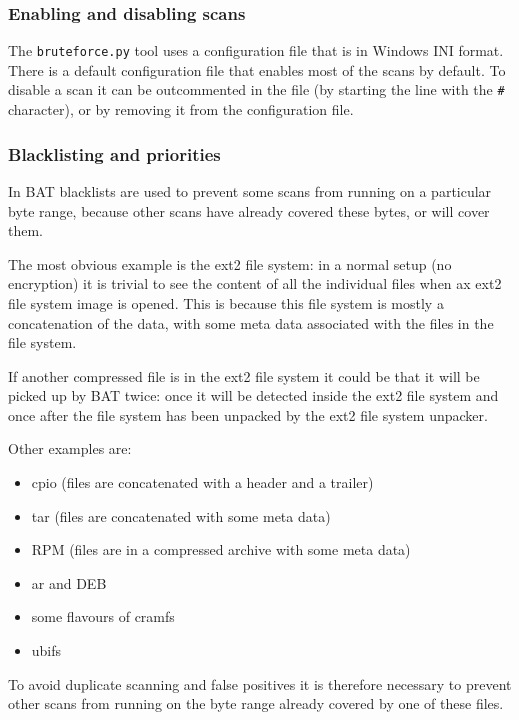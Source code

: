 \documentclass[10pt]{article}
\begin{document}
\subsubsection{Enabling and disabling scans}

The \texttt{bruteforce.py} tool uses a configuration file that is in Windows
INI format. There is a default configuration file that enables most of the
scans by default. To disable a scan it can be outcommented in the file (by
starting the line with the \texttt{\#} character), or by removing it from the
configuration file.

\subsubsection{Blacklisting and priorities}

In BAT blacklists are used to prevent some scans from running on a particular
byte range, because other scans have already covered these bytes, or will cover
them.

The most obvious example is the ext2 file system: in a normal setup (no
encryption) it is trivial to see the content of all the individual files when
ax ext2 file system image is opened. This is because this file system is
mostly a concatenation of the data, with some meta data associated with the
files in the file system.

If another compressed file is in the ext2 file system it could be that it will
be picked up by BAT twice: once it will be detected inside the ext2 file system
and once after the file system has been unpacked by the ext2 file system
unpacker.

Other examples are:

\begin{itemize}
\item cpio (files are concatenated with a header and a trailer)
\item tar (files are concatenated with some meta data)
\item RPM (files are in a compressed archive with some meta data)
\item ar and DEB
\item some flavours of cramfs
\item ubifs
\end{itemize}

To avoid duplicate scanning and false positives it is therefore necessary to
prevent other scans from running on the byte range already covered by one of
these files.
\end{document}
